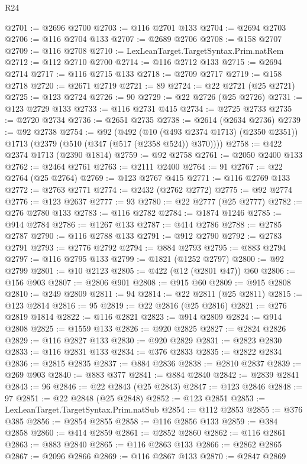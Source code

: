 \begin{lexlean}{R24}
\begin{coremodule}
@2701 := @2696 @2700
@2703 := @116 @2701 @133
@2704 := @2694 @2703
@2706 := @116 @2704 @133
@2707 := @2689 @2706
@2708 := @158 @2707
@2709 := @116 @2708
@2710 := LexLeanTarget.TargetSyntax.Prim.natRem
@2712 := @112 @2710 @2700
@2714 := @116 @2712 @133
@2715 := @2694 @2714
@2717 := @116 @2715 @133
@2718 := @2709 @2717
@2719 := @158 @2718
@2720 := @2671 @2719
@2721 := 89
@2724 := @22 @2721 (@25 @2721)
@2725 := @123 @2724
@2726 := 90
@2729 := @22 @2726 (@25 @2726)
@2731 := @123 @2729 @133
@2733 := @116 @2731 @415
@2734 := @2725 @2733
@2735 := @2720 @2734
@2736 := @2651 @2735
@2738 := @2614 (@2634 @2736)
@2739 := @92 @2738
@2754 := @92
    (@492
      (@10 (@493 @2374 @1713) (@2350 @2351))
      @1713
      (@2379 (@510 (@347 (@517 (@2358 @524)) @370))))
@2758 := @422 @2374 @1713 (@2390 @1814)
@2759 := @92 @2758
@2761 := @2050 @2400 @133
@2762 := @2464 @2761
@2763 := @2111 @2400
@2764 := 91
@2767 := @22 @2764 (@25 @2764)
@2769 := @123 @2767 @415
@2771 := @116 @2769 @133
@2772 := @2763 @2771
@2774 := @2432 (@2762 @2772)
@2775 := @92 @2774
@2776 := @123 @2637
@2777 := 93
@2780 := @22 @2777 (@25 @2777)
@2782 := @276 @2780 @133
@2783 := @116 @2782
@2784 := @1874 @1246
@2785 := @914 @2784
@2786 := @1267 @133
@2787 := @414 @2786
@2788 := @2785 @2787
@2790 := @116 @2788 @133
@2791 := @912 @2790
@2792 := @2783 @2791
@2793 := @2776 @2792
@2794 := @884 @2793
@2795 := @883 @2794
@2797 := @116 @2795 @133
@2799 := @1821 (@1252 @2797)
@2800 := @92 @2799
@2801 := @10 @2123
@2805 := @422 (@12 (@2801 @47)) @60
@2806 := @156 @903
@2807 := @2806 @901
@2808 := @915 @60
@2809 := @915 @2808
@2810 := @249 @2809
@2811 := 94
@2814 := @22 @2811 (@25 @2811)
@2815 := @123 @2814
@2816 := 95
@2819 := @22 @2816 (@25 @2816)
@2821 := @276 @2819 @1814
@2822 := @116 @2821
@2823 := @914 @2809
@2824 := @914 @2808
@2825 := @1559 @133
@2826 := @920 @2825
@2827 := @2824 @2826
@2829 := @116 @2827 @133
@2830 := @920 @2829
@2831 := @2823 @2830
@2833 := @116 @2831 @133
@2834 := @376 @2833
@2835 := @2822 @2834
@2836 := @2815 @2835
@2837 := @884 @2836
@2838 := @2810 @2837
@2839 := @269 @903
@2840 := @883 @377
@2841 := @884 @2840
@2842 := @2839 @2841
@2843 := 96
@2846 := @22 @2843 (@25 @2843)
@2847 := @123 @2846
@2848 := 97
@2851 := @22 @2848 (@25 @2848)
@2852 := @123 @2851
@2853 := LexLeanTarget.TargetSyntax.Prim.natSub
@2854 := @112 @2853
@2855 := @376 @385
@2856 := @2854 @2855
@2858 := @116 @2856 @133
@2859 := @384 @2858
@2860 := @414 @2859
@2861 := @2852 @2860
@2862 := @116 @2861
@2863 := @883 @2840
@2865 := @116 @2863 @133
@2866 := @2862 @2865
@2867 := @2096 @2866
@2869 := @116 @2867 @133
@2870 := @2847 @2869

\end{coremodule}
\end{lexlean}
